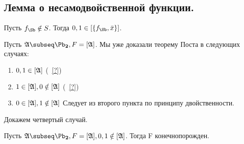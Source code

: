 \documentclass[unicode,10pt]{article}
\begin{document}
\subsection{Лемма о несамодвойственной функции.\\}
\begin{lemma}
 \label{22}
  Пусть $\fS \notin S$. Тогда $0,1 \in \cls{\fS,\bar x}$.
\end{lemma}
Пусть $\ag\subseq\PD, F=[\ag]$.
Мы уже доказали теорему Поста в следующих случаях: \REF
\begin{enumerate}
  \item $0,1\in [\mathfrak{A}]$ (~\ref{?})
  \item $1\in [\mathfrak{A}], 0\notin [\mathfrak{A}]$ (~\ref{?})
  \item $0\in [\mathfrak{A}], 1 \notin [\mathfrak{A}]$ Следует из второго пункта по принципу двойственности.
\end{enumerate}
Докажем четвертый случай.
\begin{theorem}
Пусть $\ag\subseq\PD,F=[\ag], 0,1\notin[\ag]$. Тогда F конечнопорожден.
\end{theorem}
\end{document}
